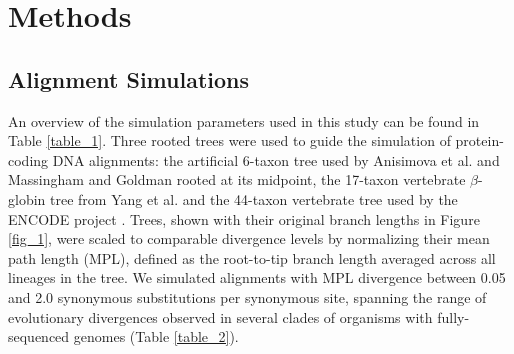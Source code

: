 \documentclass{article}
\begin{document}
\section*{Methods}



\subsection*{Alignment Simulations}

An overview of the simulation parameters used in this study can be
found in Table \ref{table_1}. Three rooted trees were used to guide
the simulation of protein-coding DNA alignments: the artificial
6-taxon tree used by Anisimova et al.
\citeyearpar{Anisimova2001Accuracy} and Massingham and Goldman
\citeyearpar{Massingham2005Detecting} rooted at its midpoint, the
17-taxon vertebrate $\beta$-globin tree from Yang et
al. \citeyearpar{Yang2000CodonSubstitution} and the 44-taxon
vertebrate tree used by the ENCODE project
\citep{2007Identification,Nikolaev2007Early}. Trees, shown with their
original branch lengths in Figure \ref{fig_1}, were scaled to
comparable divergence levels by normalizing their mean path length
(MPL), defined as the root-to-tip branch length averaged across all
lineages in the tree. We simulated alignments with MPL divergence
between 0.05 and 2.0 synonymous substitutions per synonymous site,
spanning the range of evolutionary divergences observed in several
clades of organisms with fully-sequenced genomes (Table
\ref{table_2}).
\end{document}

